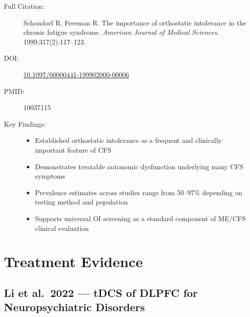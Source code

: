 \begin{description}
    \item[Full Citation:] Schondorf R, Freeman R\@. The importance of orthostatic intolerance in the chronic fatigue syndrome. \textit{American Journal of Medical Sciences}. 1999;317(2):117--123.
    \item[DOI:] \href{https://doi.org/10.1097/00000441-199902000-00006}{10.1097/00000441-199902000-00006}
    \item[PMID:] 10037115
    \item[Key Findings:]
    \begin{itemize}
        \item Established orthostatic intolerance as a frequent and clinically important feature of CFS
        \item Demonstrates treatable autonomic dysfunction underlying many CFS symptoms
        \item Prevalence estimates across studies range from 50--97\% depending on testing method and population
        \item Supports universal OI screening as a standard component of ME/CFS clinical evaluation
    \end{itemize}
\end{description}

\section{Treatment Evidence}
\label{sec:bib-treatment-evidence}

\subsection{Li et al.\ 2022 --- tDCS of DLPFC for Neuropsychiatric Disorders}

